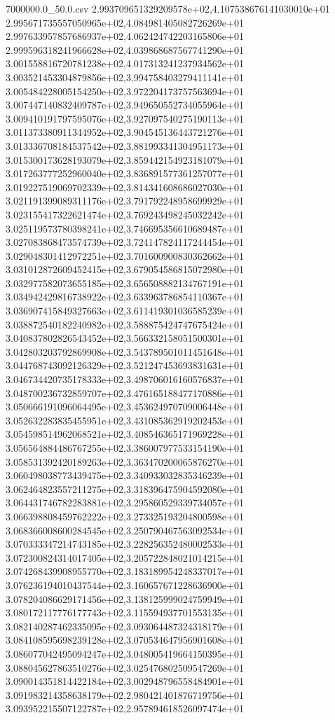\begin{filecontents*}{7000000.0_50.0.csv}
2.993709651329209578e+02,4.107538676141030010e+01
2.995671735557050965e+02,4.084981405082726269e+01
2.997633957857686937e+02,4.062424742203165806e+01
2.999596318241966628e+02,4.039868687567741290e+01
3.001558816720781238e+02,4.017313241237934562e+01
3.003521453304879856e+02,3.994758403279411141e+01
3.005484228005154250e+02,3.972204173757563694e+01
3.007447140832409787e+02,3.949650552734055964e+01
3.009410191797595076e+02,3.927097540275190113e+01
3.011373380911344952e+02,3.904545136443721276e+01
3.013336708184537542e+02,3.881993341304951173e+01
3.015300173628193079e+02,3.859442154923181079e+01
3.017263777252960040e+02,3.836891577361257077e+01
3.019227519069702339e+02,3.814341608686027030e+01
3.021191399089311176e+02,3.791792248958699929e+01
3.023155417322621474e+02,3.769243498245032242e+01
3.025119573780398241e+02,3.746695356610689487e+01
3.027083868473574739e+02,3.724147824117244454e+01
3.029048301412972251e+02,3.701600900830362662e+01
3.031012872609452415e+02,3.679054586815072980e+01
3.032977582073655185e+02,3.656508882134767191e+01
3.034942429816738922e+02,3.633963786854110367e+01
3.036907415849327663e+02,3.611419301036585239e+01
3.038872540182240982e+02,3.588875424747675424e+01
3.040837802826543452e+02,3.566332158051500301e+01
3.042803203792869908e+02,3.543789501011451648e+01
3.044768743092126329e+02,3.521247453693831631e+01
3.046734420735178333e+02,3.498706016160576837e+01
3.048700236732859707e+02,3.476165188477170886e+01
3.050666191096064495e+02,3.453624970709006448e+01
3.052632283835455951e+02,3.431085362919202453e+01
3.054598514962068521e+02,3.408546365171969228e+01
3.056564884486767255e+02,3.386007977533154190e+01
3.058531392420189263e+02,3.363470200065876270e+01
3.060498038773439475e+02,3.340933032835346239e+01
3.062464823557211275e+02,3.318396475904592080e+01
3.064431746782283881e+02,3.295860529339734057e+01
3.066398808459762222e+02,3.273325193204800598e+01
3.068366008600284545e+02,3.250790467563092534e+01
3.070333347214743185e+02,3.228256352480002533e+01
3.072300824314017405e+02,3.205722848021014215e+01
3.074268439908955770e+02,3.183189954248337017e+01
3.076236194010437544e+02,3.160657671228636900e+01
3.078204086629171456e+02,3.138125999024759949e+01
3.080172117776177743e+02,3.115594937701553135e+01
3.082140287462335095e+02,3.093064487324318179e+01
3.084108595698239128e+02,3.070534647956901608e+01
3.086077042495094247e+02,3.048005419664150395e+01
3.088045627863510276e+02,3.025476802509547269e+01
3.090014351814422184e+02,3.002948796558484901e+01
3.091983214358638179e+02,2.980421401876719756e+01
3.093952215507122787e+02,2.957894618526097474e+01

\end{filecontents*}
